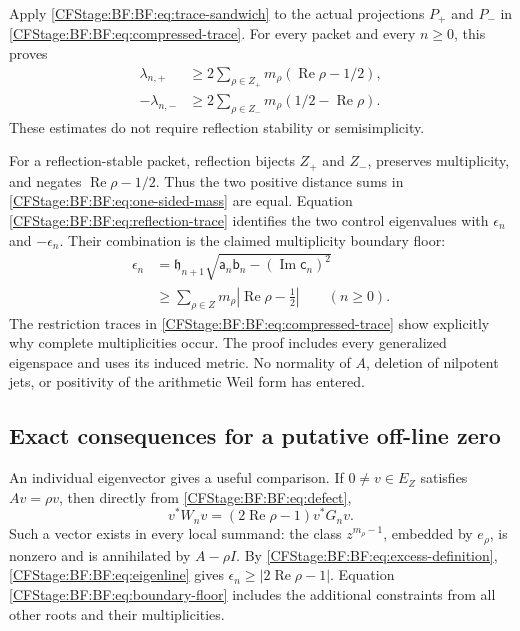 Apply \eqref{CFStage:BF:BF:eq:trace-sandwich} to the actual projections
\(P_+\) and \(P_-\) in \eqref{CFStage:BF:BF:eq:compressed-trace}.
For every packet and every \(n\ge0\), this proves
\begin{equation}
\boxed{\begin{aligned}
\lambda_{n,+}
 &\ge2\sum_{\rho\in Z_+}
          m_\rho(\operatorname{Re}\rho-1/2),\\
-\lambda_{n,-}
 &\ge2\sum_{\rho\in Z_-}
          m_\rho(1/2-\operatorname{Re}\rho).
\end{aligned}}
\tag{BF.35}\label{CFStage:BF:BF:eq:one-sided-mass}
\end{equation}
These estimates do not require reflection stability or
semisimplicity.

For a reflection-stable packet, reflection bijects \(Z_+\) and
\(Z_-\), preserves multiplicity, and negates
\(\operatorname{Re}\rho-1/2\).  Thus the two positive distance
sums in \eqref{CFStage:BF:BF:eq:one-sided-mass} are equal.
Equation \eqref{CFStage:BF:BF:eq:reflection-trace} identifies the two control
eigenvalues with \(\epsilon_n\) and \(-\epsilon_n\).
Their combination is the claimed multiplicity boundary floor:
\begin{equation}
\boxed{\begin{aligned}
\epsilon_n
 &=\mathfrak h_{n+1}
   \sqrt{\mathsf a_n\mathsf b_n-
                 (\operatorname{Im}\mathsf c_n)^2}\\
 &\ge\sum_{\rho\in Z}m_\rho
               \left|\operatorname{Re}\rho-\frac12\right|
 \qquad(n\ge0).
\end{aligned}}
\tag{BF.36}\label{CFStage:BF:BF:eq:boundary-floor}
\end{equation}
The restriction traces in \eqref{CFStage:BF:BF:eq:compressed-trace} show
explicitly why complete multiplicities occur.  The proof includes
every generalized eigenspace and uses its induced metric.  No
normality of \(A\), deletion of nilpotent jets, or positivity of
the arithmetic Weil form has entered.

\subsection{Exact consequences for a putative off-line zero}
\label{CFStage:BF:BF:counterfactual}

An individual eigenvector gives a useful comparison.
If \(0\ne v\in E_Z\) satisfies \(Av=\rho v\), then directly from
\eqref{CFStage:BF:BF:eq:defect},
\begin{equation}
v^*W_nv=(2\operatorname{Re}\rho-1)v^*G_nv.
\tag{BF.37}\label{CFStage:BF:BF:eq:eigenline}
\end{equation}
Such a vector exists in every local summand: the class
\(z^{m_\rho-1}\), embedded by \(e_\rho\), is nonzero and is
annihilated by \(A-\rho I\).  By
\eqref{CFStage:BF:BF:eq:excess-definition}, \eqref{CFStage:BF:BF:eq:eigenline} gives
\(\epsilon_n\ge|2\operatorname{Re}\rho-1|\).
Equation \eqref{CFStage:BF:BF:eq:boundary-floor} includes the additional
constraints from all other roots and their multiplicities.

